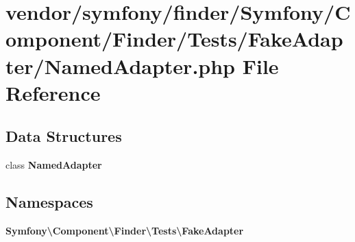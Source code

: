 \section{vendor/symfony/finder/\+Symfony/\+Component/\+Finder/\+Tests/\+Fake\+Adapter/\+Named\+Adapter.php File Reference}
\label{_named_adapter_8php}
\subsection*{Data Structures}
\begin{DoxyCompactItemize}
\item 
class {\bf Named\+Adapter}
\end{DoxyCompactItemize}
\subsection*{Namespaces}
\begin{DoxyCompactItemize}
\item 
 {\bf Symfony\textbackslash{}\+Component\textbackslash{}\+Finder\textbackslash{}\+Tests\textbackslash{}\+Fake\+Adapter}
\end{DoxyCompactItemize}
